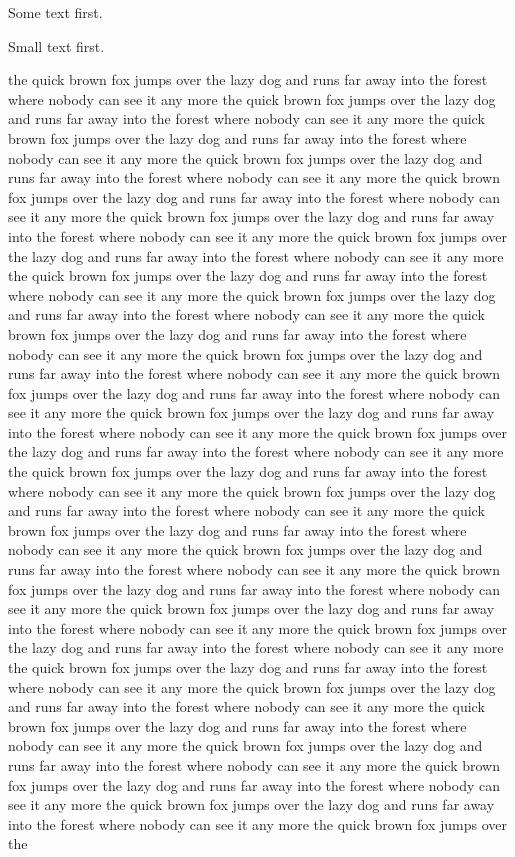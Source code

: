 \documentclass{article}
\begin{document}
Some text first.

{\small Small text first.
\begin{figure}[!t]
\vspace{512.5pt}
\end{figure}
the quick brown fox jumps over the lazy dog and runs far away into the forest where nobody can see it any more the quick brown fox jumps over the lazy dog and runs far away into the forest where nobody can see it any more the quick brown fox jumps over the lazy dog and runs far away into the forest where nobody can see it any more the quick brown fox jumps over the lazy dog and runs far away into the forest where nobody can see it any more the quick brown fox jumps over the lazy dog and runs far away into the forest where nobody can see it any more the quick brown fox jumps over the lazy dog and runs far away into the forest where nobody can see it any more the quick brown fox jumps over the lazy dog and runs far away into the forest where nobody can see it any more the quick brown fox jumps over the lazy dog and runs far away into the forest where nobody can see it any more the quick brown fox jumps over the lazy dog and runs far away into the forest where nobody can see it any more the quick brown fox jumps over the lazy dog and runs far away into the forest where nobody can see it any more the quick brown fox jumps over the lazy dog and runs far away into the forest where nobody can see it any more the quick brown fox jumps over the lazy dog and runs far away into the forest where nobody can see it any more the quick brown fox jumps over the lazy dog and runs far away into the forest where nobody can see it any more the quick brown fox jumps over the lazy dog and runs far away into the forest where nobody can see it any more the quick brown fox jumps over the lazy dog and runs far away into the forest where nobody can see it any more the quick brown fox jumps over the lazy dog and runs far away into the forest where nobody can see it any more the quick brown fox jumps over the lazy dog and runs far away into the forest where nobody can see it any more the quick brown fox jumps over the lazy dog and runs far away into the forest where nobody can see it any more the quick brown fox jumps over the lazy dog and runs far away into the forest where nobody can see it any more the quick brown fox jumps over the lazy dog and runs far away into the forest where nobody can see it any more the quick brown fox jumps over the lazy dog and runs far away into the forest where nobody can see it any more the quick brown fox jumps over the lazy dog and runs far away into the forest where nobody can see it any more the quick brown fox jumps over the lazy dog and runs far away into the forest where nobody can see it any more the quick brown fox jumps over the lazy dog and runs far away into the forest where nobody can see it any more the quick brown fox jumps over the lazy dog and runs far away into the forest where nobody can see it any more the quick brown fox jumps over the lazy dog and runs far away into the forest where nobody can see it any more the quick brown fox jumps over the lazy dog and runs far away into the forest where nobody can see it any more the quick brown fox jumps over the }
\end{document}
